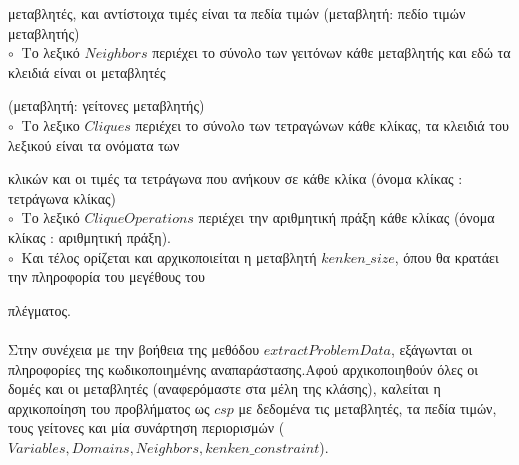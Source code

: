 \documentclass[10pt]{article}
\begin{document}
\hspace{3mm} μεταβλητές, και αντίστοιχα τιμές είναι τα πεδία τιμών (μεταβλητή: πεδίο τιμών μεταβλητής) \\

$\circ \ $ Το λεξικό $Neighbors$ περιέχει το σύνολο των γειτόνων κάθε μεταβλητής και εδώ τα κλειδιά είναι οι μεταβλητές 

\hspace{3mm} (μεταβλητή: γείτονες μεταβλητής)\\

$\circ \ $ Το λεξικο $Cliques$ περιέχει το σύνολο των τετραγώνων κάθε κλίκας, τα κλειδιά του λεξικού είναι τα ονόματα των 

\hspace{3mm} κλικών και οι τιμές τα τετράγωνα που ανήκουν σε κάθε κλίκα (όνομα κλίκας : τετράγωνα κλίκας) \\

$\circ \ $ Το λεξικό $CliqueOperations $ περιέχει την αριθμητική πράξη κάθε κλίκας (όνομα κλίκας : αριθμητική πράξη).\\

$\circ \ $  Και τέλος ορίζεται και αρχικοποιείται η μεταβλητή $kenken\_size$, όπου θα κρατάει την πληροφορία του μεγέθους του 

\hspace{3mm} πλέγματος. \\ \\

Στην συνέχεια με την βοήθεια της μεθόδου $extractProblemData $, εξάγωνται οι πληροφορίες της κωδικοποιημένης αναπαράστασης.Αφού αρχικοποιηθούν όλες οι δομές και οι μεταβλητές (αναφερόμαστε στα μέλη της κλάσης), καλείται η αρχικοποίηση του προβλήματος ως $csp$ με δεδομένα τις μεταβλητές, τα πεδία τιμών, τους γείτονες και μία συνάρτηση περιορισμών ($ Variables, Domains, Neighbors, kenken\_constraint$).  \\
\end{document}
